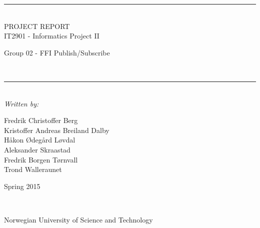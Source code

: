 \thispagestyle{empty}
\begin{center}
\noindent\rule{\textwidth}{0.5pt}
\\[1pc]
\Huge{PROJECT REPORT}
\\[1pc]
\large{IT2901 - Informatics Project II}
\\[1pc]
\begin{small}
\begin{bf}Group 02 - FFI Publish/Subscribe\end{bf}
\end{small}
\\[1pc]
\noindent\rule{\textwidth}{0.5pt}
\\[5pc]
\textit{Written by:}
\\[1pc]
\begin{small}
Fredrik Christoffer Berg\\Kristoffer Andreas Breiland Dalby\\Håkon Ødegård Løvdal\\Aleksander Skraastad\\Fredrik Borgen Tørnvall\\ Trond Walleraunet\\[7pc]
\end{small}
\begin{bf}
Spring 2015
\end{bf}
\\[8pc]

\noindent{}

\begin{small}Norwegian University of Science and Technology\end{small}

\end{center}

\pagebreak